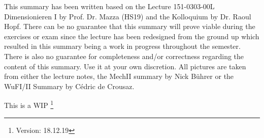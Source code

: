 



\maketitle
\begin{center}
    This summary has been written based on the Lecture 151-0303-00L  Dimensionieren I by Prof. Dr. Mazza (HS19) and the Kolloquium by Dr. Raoul Hopf. There can be no guarantee that this summary will prove viable during the exercises or exam since the lecture has been redesigned from the ground up which resulted in this summary being a work in progress throughout the semester. There is also no guarantee for completeness and/or correctness regarding the content of this summary. Use it at your own discretion. All pictures are taken from either the lecture notes, the MechII summary by Nick Bührer or the WuFI/II Summary by Cédric de Crousaz.
    
    This is a WIP 
    \footnote{\label{foot:2}Version: 18.12.19}
\end{center}
\newpage
\begin{multicols*}{3}




















\end{multicols*}     

